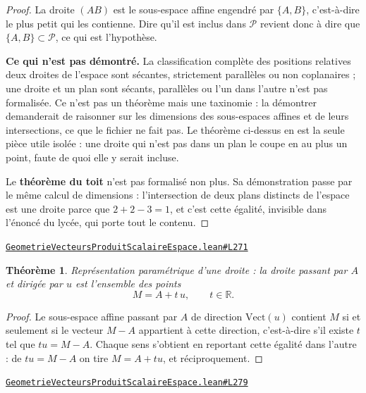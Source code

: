 \documentclass[11pt,a4paper]{article}
\theoremstyle{definition}
\theoremstyle{plain}
\newtheorem{theoreme}{Théorème}
\newcommand{\source}[2]{\par\smallskip\noindent\hfill{\footnotesize\href{#1}{\texttt{#2}}}\par\smallskip}
\begin{document}
\begin{proof}
La droite $(AB)$ est le sous-espace affine engendré par $\{A, B\}$, c'est-à-dire le plus
petit qui les contienne. Dire qu'il est inclus dans $\mathcal{P}$ revient donc à dire que
$\{A, B\} \subset \mathcal{P}$, ce qui est l'hypothèse.

\medskip\noindent
\textbf{Ce qui n'est pas démontré.} La classification complète des positions relatives
\textemdash{} deux droites de l'espace sont sécantes, strictement parallèles ou non
coplanaires ; une droite et un plan sont sécants, parallèles ou l'un dans l'autre
\textemdash{} n'est pas formalisée. Ce n'est pas un théorème mais une taxinomie : la
démontrer demanderait de raisonner sur les dimensions des sous-espaces affines et de leurs
intersections, ce que le fichier ne fait pas. Le théorème ci-dessus en est la seule pièce
utile isolée : une droite qui n'est pas dans un plan le coupe en au plus un point, faute de
quoi elle y serait incluse.

\medskip\noindent
Le \textbf{théorème du toit} n'est pas formalisé non plus. Sa démonstration passe par le
même calcul de dimensions : l'intersection de deux plans distincts de l'espace est une
droite parce que $2 + 2 - 3 = 1$, et c'est cette égalité, invisible dans l'énoncé du
lycée, qui porte tout le contenu.
\end{proof}
\source{https://github.com/Commutator-IO/learn-lean/blob/main/cours/02-lycee/08-geometrie-vecteurs-produit-scalaire-espace/GeometrieVecteursProduitScalaireEspace.lean\#L271}{GeometrieVecteursProduitScalaireEspace.lean\#L271}

\begin{theoreme}
Représentation paramétrique d'une droite : la droite passant par $A$ et dirigée par $u$
est l'ensemble des points
\[ M = A + t\,u , \qquad t \in \mathbb{R} . \]
\end{theoreme}

\begin{proof}
Le sous-espace affine passant par $A$ de direction $\mathrm{Vect}(u)$ contient $M$ si et
seulement si le vecteur $M - A$ appartient à cette direction, c'est-à-dire s'il existe $t$
tel que $tu = M - A$. Chaque sens s'obtient en reportant cette égalité dans l'autre : de
$tu = M - A$ on tire $M = A + tu$, et réciproquement.
\end{proof}
\source{https://github.com/Commutator-IO/learn-lean/blob/main/cours/02-lycee/08-geometrie-vecteurs-produit-scalaire-espace/GeometrieVecteursProduitScalaireEspace.lean\#L279}{GeometrieVecteursProduitScalaireEspace.lean\#L279}
\end{document}
